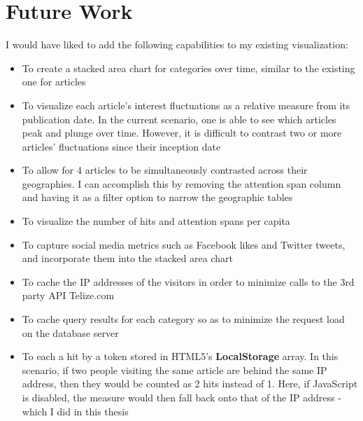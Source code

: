 \documentclass[12pt]{article}
\begin{document}
\section{Future Work}
I would have liked to add the following capabilities to my existing visualization:
\begin{itemize}
\item To create a stacked area chart for categories over time, similar to the existing one for articles
\item To visualize each article's interest fluctuations as a relative measure from its publication date. In the current scenario, one is able to see which articles peak and plunge over time. However, it is difficult to contrast two or more articles' fluctuations since their inception date
\item To allow for 4 articles to be simultaneously contrasted across their geographies. I can accomplish this by removing the attention span column and having it as a filter option to narrow the geographic tables
\item To visualize the number of hits and attention spans per capita
\item To capture social media metrics such as Facebook likes and  Twitter tweets, and incorporate them into the stacked area chart 
\item To cache the IP addresses of the visitors in order to minimize calls to the 3rd party API Telize.com
\item To cache query results for each category so as to minimize the request load on the database server
\item To each a hit by a token stored in HTML5's \textbf{LocalStorage} array. In this scenario, if two people visiting the same article are behind the same IP address, then they would be counted as 2 hits instead of 1. Here, if JavaScript is disabled, the measure would then fall back onto that of the IP address - which I did in this thesis 
\end{itemize}
\newpage
\end{document}
